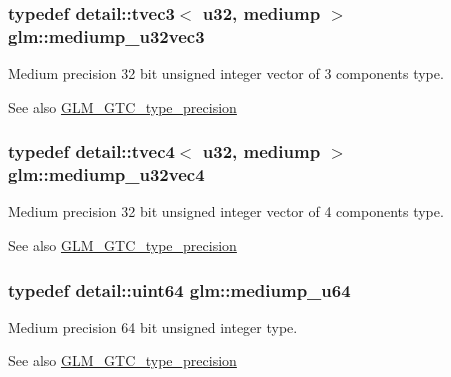 \subsubsection[{\texorpdfstring{mediump\+\_\+u32vec3}{mediump_u32vec3}}]{\setlength{\rightskip}{0pt plus 5cm}typedef detail\+::tvec3$<$ u32, mediump $>$ {\bf glm\+::mediump\+\_\+u32vec3}}\hypertarget{group__gtc__type__precision_ga84a903ce8834b22f78d80a64eb0181bb}{}\label{group__gtc__type__precision_ga84a903ce8834b22f78d80a64eb0181bb}
Medium precision 32 bit unsigned integer vector of 3 components type. \begin{DoxySeeAlso}{See also}
\hyperlink{group__gtc__type__precision}{G\+L\+M\+\_\+\+G\+T\+C\+\_\+type\+\_\+precision} 
\end{DoxySeeAlso}
\subsubsection[{\texorpdfstring{mediump\+\_\+u32vec4}{mediump_u32vec4}}]{\setlength{\rightskip}{0pt plus 5cm}typedef detail\+::tvec4$<$ u32, mediump $>$ {\bf glm\+::mediump\+\_\+u32vec4}}\hypertarget{group__gtc__type__precision_ga532f59ac4c36a7e1371341165f7be33b}{}\label{group__gtc__type__precision_ga532f59ac4c36a7e1371341165f7be33b}
Medium precision 32 bit unsigned integer vector of 4 components type. \begin{DoxySeeAlso}{See also}
\hyperlink{group__gtc__type__precision}{G\+L\+M\+\_\+\+G\+T\+C\+\_\+type\+\_\+precision} 
\end{DoxySeeAlso}
\subsubsection[{\texorpdfstring{mediump\+\_\+u64}{mediump_u64}}]{\setlength{\rightskip}{0pt plus 5cm}typedef detail\+::uint64 {\bf glm\+::mediump\+\_\+u64}}\hypertarget{group__gtc__type__precision_ga00c51a16fa190b0a90205d50d6d8a44a}{}\label{group__gtc__type__precision_ga00c51a16fa190b0a90205d50d6d8a44a}
Medium precision 64 bit unsigned integer type. \begin{DoxySeeAlso}{See also}
\hyperlink{group__gtc__type__precision}{G\+L\+M\+\_\+\+G\+T\+C\+\_\+type\+\_\+precision} 
\end{DoxySeeAlso}
